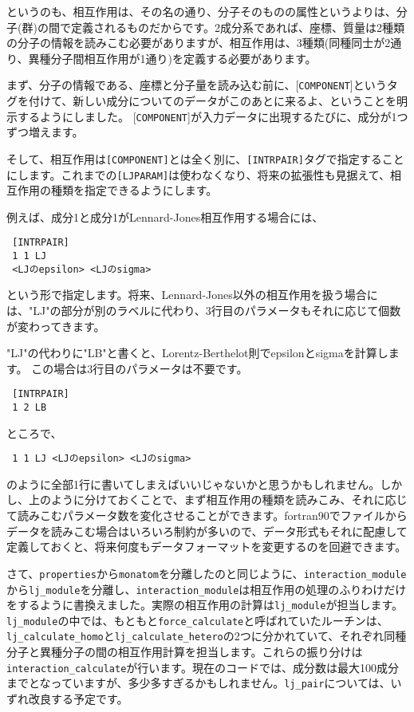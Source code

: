 \documentclass[a4,10pt]{article}
\begin{document}
というのも、相互作用は、その名の通り、分子そのものの属性というよりは、分子(群)の間で定義されるものだからです。2成分系であれば、座標、質量は2種類の分子の情報を読みこむ必要がありますが、相互作用は、3種類(同種同士が2通り、異種分子間相互作用が1通り)を定義する必要があります。

まず、分子の情報である、座標と分子量を読み込む前に、[{\tt COMPONENT}]というタグを付けて、新しい成分についてのデータがこのあとに来るよ、ということを明示するようにしました。
[{\tt COMPONENT}]が入力データに出現するたびに、成分が1つずつ増えます。

そして、相互作用は{\tt [COMPONENT]}とは全く別に、{\tt [INTRPAIR]}タグで指定することにします。これまでの{\tt [LJPARAM]}は使わなくなり、将来の拡張性も見据えて、相互作用の種類を指定できるようにします。

例えば、成分1と成分1がLennard-Jones相互作用する場合には、
\begin{screen}\begin{verbatim}
 [INTRPAIR]
 1 1 LJ
 <LJのepsilon> <LJのsigma>
\end{verbatim}\end{screen}
という形で指定します。将来、Lennard-Jones以外の相互作用を扱う場合には、"LJ"の部分が別のラベルに代わり、3行目のパラメータもそれに応じて個数が変わってきます。

"LJ"の代わりに"LB"と書くと、Lorentz-Berthelot則でepsilonとsigmaを計算します。
この場合は3行目のパラメータは不要です。
\begin{screen}\begin{verbatim}
 [INTRPAIR]
 1 2 LB
\end{verbatim}\end{screen}

ところで、
\begin{screen}\begin{verbatim}
 1 1 LJ <LJのepsilon> <LJのsigma>
\end{verbatim}\end{screen}
のように全部1行に書いてしまえばいいじゃないかと思うかもしれません。しかし、上のように分けておくことで、まず相互作用の種類を読みこみ、それに応じて読みこむパラメータ数を変化させることができます。fortran90でファイルからデータを読みこむ場合はいろいろ制約が多いので、データ形式もそれに配慮して定義しておくと、将来何度もデータフォーマットを変更するのを回避できます。

さて、{\tt properties}から{\tt monatom}を分離したのと同じように、{\tt interaction\_module}から{\tt lj\_module}を分離し、{\tt interaction\_module}は相互作用の処理のふりわけだけをするように書換えました。実際の相互作用の計算は{\tt lj\_module}が担当します。{\tt lj\_module}の中では、もともと{\tt force\_calculate}と呼ばれていたルーチンは、{\tt lj\_calculate\_homo}と{\tt lj\_calculate\_hetero}の2つに分かれていて、それぞれ同種分子と異種分子の間の相互作用計算を担当します。これらの振り分けは{\tt interaction\_calculate}が行います。現在のコードでは、成分数は最大100成分までとなっていますが、多少多すぎるかもしれません。{\tt lj\_pair}については、いずれ改良する予定です。
\end{document}
